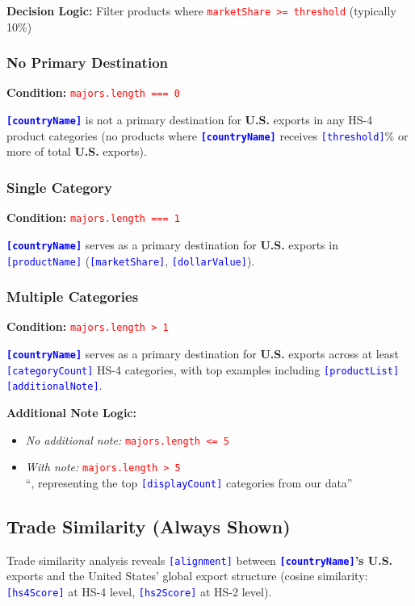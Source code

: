 \documentclass[12pt]{article}
\newcommand{\var}[1]{\textcolor{blue}{\texttt{[#1]}}}
\newcommand{\bold}[1]{\textbf{#1}}
\newcommand{\cond}[1]{\textcolor{red}{\texttt{#1}}}
\begin{document}
\textbf{Decision Logic:} Filter products where \cond{marketShare >= threshold} (typically 10\%)

\subsubsection{No Primary Destination}
\textbf{Condition:} \cond{majors.length === 0}

\bold{\var{countryName}} is not a primary destination for \bold{U.S.} exports in any HS-4 product categories (no products where \bold{\var{countryName}} receives \var{threshold}\% or more of total \bold{U.S.} exports).

\subsubsection{Single Category}
\textbf{Condition:} \cond{majors.length === 1}

\bold{\var{countryName}} serves as a primary destination for \bold{U.S.} exports in \var{productName} (\var{marketShare}, \var{dollarValue}).

\subsubsection{Multiple Categories}
\textbf{Condition:} \cond{majors.length > 1}

\bold{\var{countryName}} serves as a primary destination for \bold{U.S.} exports across at least \var{categoryCount} HS-4 categories, with top examples including \var{productList}\var{additionalNote}.

\textbf{Additional Note Logic:}
\begin{itemize}[noitemsep]
\item \textit{No additional note:} \cond{majors.length <= 5}
\item \textit{With note:} \cond{majors.length > 5}\\
``, representing the top \var{displayCount} categories from our data''
\end{itemize}

\subsection{Trade Similarity (Always Shown)}
Trade similarity analysis reveals \var{alignment} between \bold{\var{countryName}'s U.S.} exports and the United States' global export structure (cosine similarity: \var{hs4Score} at HS-4 level, \var{hs2Score} at HS-2 level).
\end{document}
